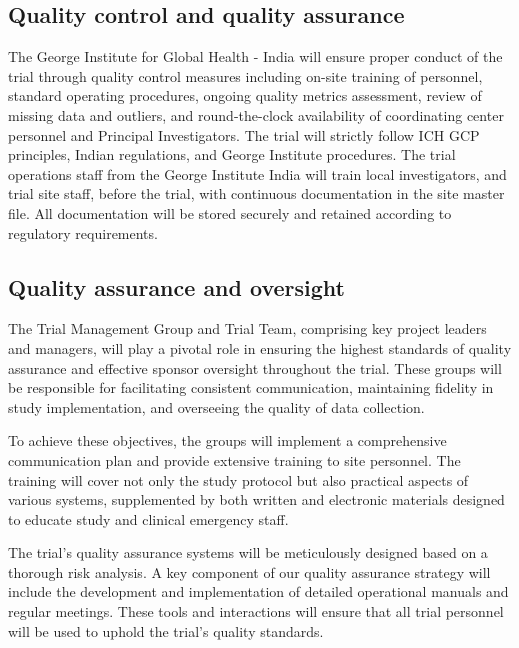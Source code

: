 \documentclass[
]{scrartcl}
\begin{document}
\hypertarget{quality-control-and-quality-assurance}{%
\subsection{Quality control and quality
assurance}\label{quality-control-and-quality-assurance}}

The George Institute for Global Health - India will ensure proper
conduct of the trial through quality control measures including on-site
training of personnel, standard operating procedures, ongoing quality
metrics assessment, review of missing data and outliers, and
round-the-clock availability of coordinating center personnel and
Principal Investigators. The trial will strictly follow ICH GCP
principles, Indian regulations, and George Institute procedures. The
trial operations staff from the George Institute India will train local
investigators, and trial site staff, before the trial, with continuous
documentation in the site master file. All documentation will be stored
securely and retained according to regulatory requirements.

\hypertarget{quality-assurance-and-oversight}{%
\subsection{Quality assurance and
oversight}\label{quality-assurance-and-oversight}}

The Trial Management Group and Trial Team, comprising key project
leaders and managers, will play a pivotal role in ensuring the highest
standards of quality assurance and effective sponsor oversight
throughout the trial. These groups will be responsible for facilitating
consistent communication, maintaining fidelity in study implementation,
and overseeing the quality of data collection.

To achieve these objectives, the groups will implement a comprehensive
communication plan and provide extensive training to site personnel. The
training will cover not only the study protocol but also practical
aspects of various systems, supplemented by both written and electronic
materials designed to educate study and clinical emergency staff.

The trial's quality assurance systems will be meticulously designed
based on a thorough risk analysis. A key component of our quality
assurance strategy will include the development and implementation of
detailed operational manuals and regular meetings. These tools and
interactions will ensure that all trial personnel will be used to uphold
the trial's quality standards.
\end{document}
